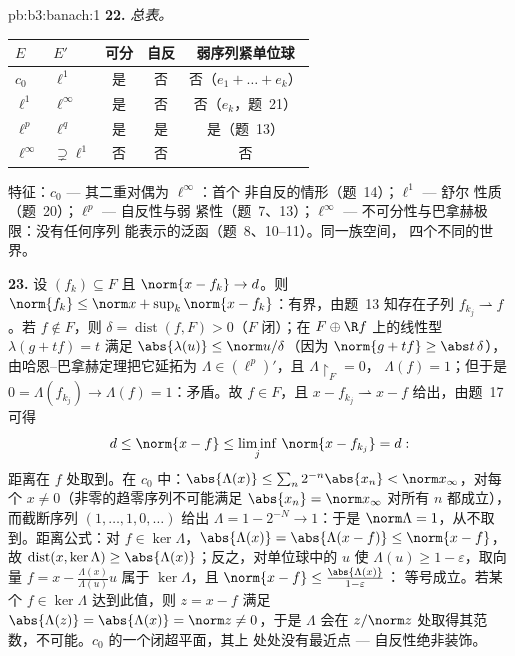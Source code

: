 \begin{solution}{pb:b3:banach:1}
\textbf{22.} \emph{总表。}
\begin{center}
\begin{tabular}{l|l|c|c|c}
$E$ & $E'$ & 可分 & 自反 & 弱序列紧单位球\\
\hline
$c_0$ & $\ell^1$ & 是 & 否 & 否（$e_1{+}\dots{+}e_k$）\\
$\ell^1$ & $\ell^\infty$ & 是 & 否 & 否（$e_k$，题~21）\\
$\ell^p$ & $\ell^q$ & 是 & 是 & 是（题~13）\\
$\ell^\infty$ & $\supsetneq\ell^1$ & 否 & 否 & 否\\
\end{tabular}
\end{center}
特征：$c_0$ --- 其二重对偶为 $\ell^\infty$：首个
非自反的情形（题~14）；$\ell^1$ --- 舒尔
性质（题~20）；$\ell^p$ --- 自反性与弱
紧性（题~7、13）；$\ell^\infty$ ---
不可分性与巴拿赫极限：没有任何序列
能表示的泛函（题~8、10--11）。同一族空间，
四个不同的世界。

\textbf{23.} 设 $(f_k) \subseteq F$ 且 $\norm{x - f_k}
\to d$。则 $\norm{f_k} \leq \norm x + \sup_k\norm{x -
f_k}$：有界，由题~13 知存在子列 $f_{k_j}
\rightharpoonup f$。若 $f \notin F$，则 $\delta =
\operatorname{dist}(f, F) > 0$（$F$ 闭）；在 $F \oplus \R
f$ 上的线性型 $\lambda(g + tf) = t$ 满足
$\abs{\lambda(u)} \leq \norm u/\delta$（因为 $\norm{g +
tf} \geq \abs t\,\delta$），由哈恩--巴拿赫定理把它延拓为
$\Lambda \in (\ell^p)'$，且 $\Lambda\restriction_F = 0$，
$\Lambda(f) = 1$；但于是 $0 = \Lambda(f_{k_j}) \to
\Lambda(f) = 1$：矛盾。故 $f \in F$，且 $x -
f_{k_j} \rightharpoonup x - f$ 给出，由题~17 可得
\[
d \leq \norm{x - f} \leq \liminf_j\,\norm{x - f_{k_j}} = d :
\]
距离在 $f$ 处取到。在 $c_0$ 中：$\abs{\Lambda(x)}
\leq \sum_n2^{-n}\abs{x_n} < \norm x_\infty$，对每个 $x
\neq 0$（非零的趋零序列不可能满足 $\abs{x_n} =
\norm x_\infty$ 对所有 $n$ 都成立），而截断序列 $(1,
\dots, 1, 0, \dots)$ 给出 $\Lambda = 1 - 2^{-N} \to 1$：于是
$\norm\Lambda = 1$，从不取到。距离公式：对 $f
\in \ker\Lambda$，$\abs{\Lambda(x)} = \abs{\Lambda(x - f)}
\leq \norm{x - f}$，故 $\operatorname{dist}(x, \ker\Lambda)
\geq \abs{\Lambda(x)}$；反之，对单位球中的 $u$
使 $\Lambda(u) \geq 1 - \varepsilon$，取向量 $f = x -
\frac{\Lambda(x)}{\Lambda(u)}u$ 属于 $\ker\Lambda$，且
$\norm{x - f} \leq \frac{\abs{\Lambda(x)}}{1 - \varepsilon}$：
等号成立。若某个 $f \in \ker\Lambda$ 达到此值，则 $z = x -
f$ 满足 $\abs{\Lambda(z)} = \abs{\Lambda(x)} =
\norm z \neq 0$，于是 $\Lambda$ 会在
$z/\norm z$ 处取得其范数，不可能。$c_0$ 的一个闭超平面，其上
处处没有最近点 --- 自反性绝非装饰。


\end{solution}
